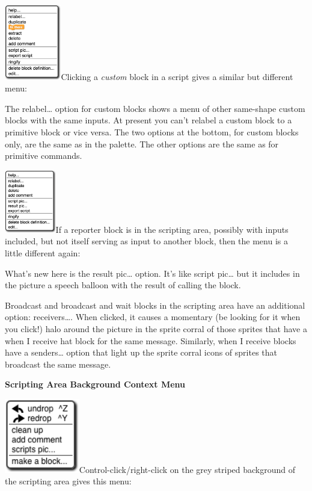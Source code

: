 \includegraphics[width=0.97361in,height=1.29861in]{media/image1073.png}Clicking
a \emph{custom} block in a script gives a similar but different menu:

The relabel\ldots{} option for custom blocks shows a menu of other
same-shape custom blocks with the same inputs. At present you can't
relabel a custom block to a primitive block or vice versa. The two
options at the bottom, for custom blocks only, are the same as in the
palette. The other options are the same as for primitive commands.

\includegraphics[width=0.88125in,height=1.08333in]{media/image1074.png}If
a reporter block is in the scripting area, possibly with inputs
included, but not itself serving as input to another block, then the
menu is a little different again:

What's new here is the result pic\ldots{} option. It's like script
pic\ldots{} but it includes in the picture a speech balloon with the
result of calling the block.

Broadcast and broadcast and wait blocks in the scripting area have an
additional option: receivers\ldots. When clicked, it causes a momentary
(be looking for it when you click!) halo around the picture in the
sprite corral of those sprites that have a when I receive hat block for
the same message. Similarly, when I receive blocks have a
senders\ldots{} option that light up the sprite corral icons of sprites
that broadcast the same message.

\textbf{Scripting Area Background Context Menu}

\includegraphics[width=1.28958in,height=1.27778in]{media/image1075.png}Control-click/right-click
on the grey striped background of the scripting area gives this menu:

